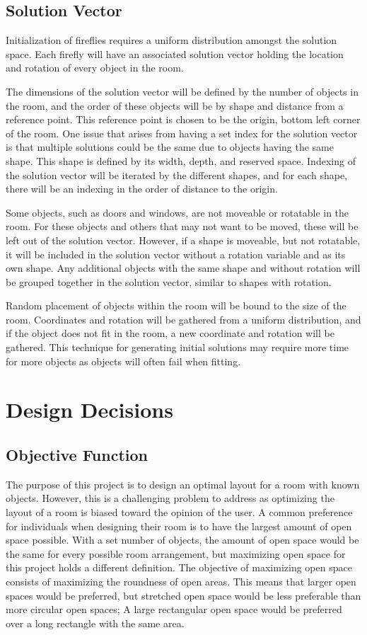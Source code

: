 \documentclass[conference]{IEEEtran}
\begin{document}
    \subsection{Solution Vector}
    Initialization of fireflies requires a uniform distribution amongst the solution space. Each firefly will have an associated solution vector holding the location and rotation of every object in the room. 
    
    The dimensions of the solution vector will be defined by the number of objects in the room, and the order of these objects will be by shape and distance from a reference point. This reference point is chosen to be the origin, bottom left corner of the room. One issue that arises from having a set index for the solution vector is that multiple solutions could be the same due to objects having the same shape. This shape is defined by its width, depth, and reserved space. Indexing of the solution vector will be iterated by the different shapes, and for each shape, there will be an indexing in the order of distance to the origin.
    
    Some objects, such as doors and windows, are not moveable or rotatable in the room. For these objects and others that may not want to be moved, these will be left out of the solution vector. However, if a shape is moveable, but not rotatable, it will be included in the solution vector without a rotation variable and as its own shape. Any additional objects with the same shape and without rotation will be grouped together in the solution vector, similar to shapes with rotation.
    
    Random placement of objects within the room will be bound to the size of the room. Coordinates and rotation will be gathered from a uniform distribution, and if the object does not fit in the room, a new coordinate and rotation will be gathered. This technique for generating initial solutions may require more time for more objects as objects will often fail when fitting.
    

\section{Design Decisions}
    \subsection{Objective Function}
    The purpose of this project is to design an optimal layout for a room with known objects. However, this is a challenging problem to address as optimizing the layout of a room is biased toward the opinion of the user. A common preference for individuals when designing their room is to have the largest amount of open space possible. With a set number of objects, the amount of open space would be the same for every possible room arrangement, but maximizing open space for this project holds a different definition. The objective of maximizing open space consists of maximizing the roundness of open areas. This means that larger open spaces would be preferred, but stretched open space would be less preferable than more circular open spaces; A large rectangular open space would be preferred over a long rectangle with the same area.
    
\end{document}
